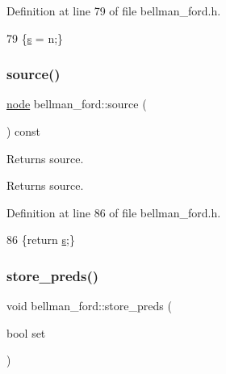 Definition at line 79 of file bellman\+\_\+ford.\+h.


\begin{DoxyCode}
79 \{\mbox{\hyperlink{classbellman__ford_a2d6ce715e65b26822c622b322811c3b0}{s}} = n;\}    
\end{DoxyCode}
\mbox{\label{classbellman__ford_a86e3fe7fe71d7569cc73e9e531d58539}} 
\subsubsection{\texorpdfstring{source()}{source()}\hspace{0.1cm}{\footnotesize\ttfamily [2/2]}}
{\footnotesize\ttfamily \mbox{\hyperlink{classnode}{node}} bellman\+\_\+ford\+::source (\begin{DoxyParamCaption}{ }\end{DoxyParamCaption}) const\hspace{0.3cm}{\ttfamily [inline]}}



Returns source. 

\begin{DoxyReturn}{Returns}
source. 
\end{DoxyReturn}


Definition at line 86 of file bellman\+\_\+ford.\+h.


\begin{DoxyCode}
86 \{\textcolor{keywordflow}{return} \mbox{\hyperlink{classbellman__ford_a2d6ce715e65b26822c622b322811c3b0}{s}};\}
\end{DoxyCode}
\mbox{\label{classbellman__ford_aac87169a3cf4f95477ce215a0cb7a12b}} 
\subsubsection{\texorpdfstring{store\+\_\+preds()}{store\_preds()}\hspace{0.1cm}{\footnotesize\ttfamily [1/2]}}
{\footnotesize\ttfamily void bellman\+\_\+ford\+::store\+\_\+preds (\begin{DoxyParamCaption}\item[{bool}]{set }\end{DoxyParamCaption})}



